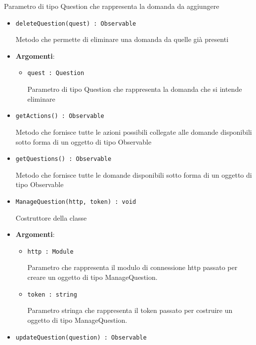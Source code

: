 \documentclass[../DefinizioneDiProdotto.tex]{subfiles}
\begin{document}
\begin{itemize}
\begin{itemize}
\begin{itemize}
\begin{itemize}
	 Parametro di tipo Question che rappresenta la domanda da aggiungere
	\end{itemize}
	\end{itemize}\vspace{0.5em}
	\begin{itemize}
	\item \texttt{deleteQuestion(quest) : Observable}\

	 Metodo che permette di eliminare una domanda da quelle già presenti

	\item \textbf{Argomenti}:
	\begin{itemize}
	\item \texttt{quest : Question}\

	 Parametro di tipo Question che rappresenta la domanda che si intende eliminare
	\end{itemize}
	\end{itemize}\vspace{0.5em}
	\begin{itemize}
	\item \texttt{getActions() : Observable}\

	 Metodo che fornisce tutte le azioni possibili collegate alle domande disponibili sotto forma di un oggetto di tipo Observable
	\end{itemize}\vspace{0.5em}
	\begin{itemize}
	\item \texttt{getQuestions() : Observable}\

	 Metodo che fornisce tutte le domande disponibili sotto forma di un oggetto di tipo Observable
	\end{itemize}\vspace{0.5em}
	\begin{itemize}
	\item \texttt{ManageQuestion(http, token) : void}\

	 Costruttore della classe

	\item \textbf{Argomenti}:
	\begin{itemize}
	\item \texttt{http : Module}\

	 Parametro che rappresenta il modulo di connessione http passato per creare un oggetto di tipo ManageQuestion.
	\item \texttt{token : string}\

	 Parametro stringa che rappresenta il token passato per costruire un oggetto di tipo ManageQuestion.
	\end{itemize}
	\end{itemize}\vspace{0.5em}
	\begin{itemize}
	\item \texttt{updateQuestion(question) : Observable}\


\end{itemize}
\end{itemize}
\end{itemize}
\end{document}
